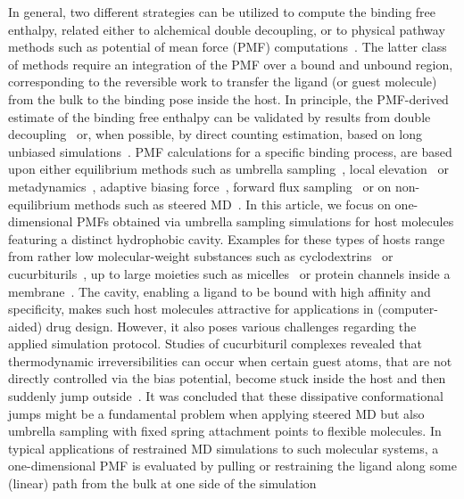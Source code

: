 \documentclass[9pt,lessons,pubversion]{livecoms}
\begin{document}
In general, two different strategies can be utilized to compute the binding free enthalpy, related either to alchemical double decoupling, or to physical pathway methods such as potential of mean force (PMF) computations~\cite{deng2009computations}.
The latter class of methods require an integration of the PMF over a bound and unbound region, corresponding to the reversible work to transfer the ligand (or guest molecule) from the bulk to the binding pose inside the host.
In principle, the PMF-derived estimate of the binding free enthalpy can be validated by results from double decoupling~\cite{markthaler2017molecular, gumbart2012standard} or, when possible, 
by direct counting estimation, based on long unbiased simulations~\cite{pan2017quantitative, baz2018insights}.
PMF calculations for a specific binding process, are based upon either equilibrium methods such as umbrella sampling~\cite{torrie1974monte, torrie1977nonphysical}, local elevation~\cite{huber1994local} 
or metadynamics~\cite{laio2002escaping}, adaptive biasing force~\cite{darve2008adaptive}, forward flux sampling~\cite{allen2009forward} or on non-equilibrium methods such as steered MD~\cite{isralewitz2001steered_1}.
In this article, we focus on one-dimensional PMFs obtained via umbrella sampling simulations for host molecules featuring a distinct hydrophobic cavity.
Examples for these types of hosts range from rather low molecular-weight substances such as cyclodextrins~\cite{del2004cyclodextrins} or cucurbiturils~\cite{velez2012force, velez2013overcoming}, 
up to large moieties such as micelles~\cite{yordanova2017solute} or protein channels inside a membrane~\cite{allen2006ion, allen2006molecular, hub2010g_wham, flood2019atomistic}.
The cavity, enabling a ligand to be bound with high affinity and specificity, makes such host molecules attractive for applications in (computer-aided) drug design.
However, it also poses various challenges regarding the applied simulation protocol.
Studies of cucurbituril complexes revealed that thermodynamic irreversibilities can occur when certain guest atoms, that are not directly controlled via the bias potential, become stuck inside the host and then suddenly jump outside~\cite{velez2012force, velez2013overcoming}.
It was concluded that these dissipative conformational jumps might be a fundamental problem when applying steered MD but also umbrella sampling with fixed spring attachment points to flexible molecules.
In typical applications of restrained MD simulations to such molecular systems, a one-dimensional PMF is evaluated by pulling or restraining the ligand along some (linear) path from the bulk at one side of the simulation 
\end{document}
